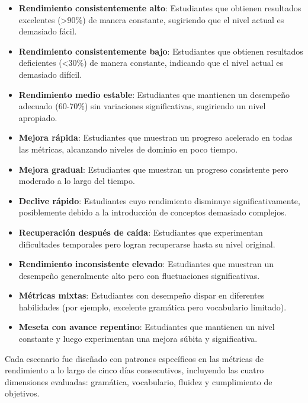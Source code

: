 \begin{itemize}
    \item \textbf{Rendimiento consistentemente alto}: Estudiantes que obtienen resultados excelentes (>90\%) de manera constante, sugiriendo que el nivel actual es demasiado fácil.
    
    \item \textbf{Rendimiento consistentemente bajo}: Estudiantes que obtienen resultados deficientes (<30\%) de manera constante, indicando que el nivel actual es demasiado difícil.
    
    \item \textbf{Rendimiento medio estable}: Estudiantes que mantienen un desempeño adecuado (60-70\%) sin variaciones significativas, sugiriendo un nivel apropiado.
    
    \item \textbf{Mejora rápida}: Estudiantes que muestran un progreso acelerado en todas las métricas, alcanzando niveles de dominio en poco tiempo.
    
    \item \textbf{Mejora gradual}: Estudiantes que muestran un progreso consistente pero moderado a lo largo del tiempo.
    
    \item \textbf{Declive rápido}: Estudiantes cuyo rendimiento disminuye significativamente, posiblemente debido a la introducción de conceptos demasiado complejos.
    
    \item \textbf{Recuperación después de caída}: Estudiantes que experimentan dificultades temporales pero logran recuperarse hasta su nivel original.
    
    \item \textbf{Rendimiento inconsistente elevado}: Estudiantes que muestran un desempeño generalmente alto pero con fluctuaciones significativas.
    
    \item \textbf{Métricas mixtas}: Estudiantes con desempeño dispar en diferentes habilidades (por ejemplo, excelente gramática pero vocabulario limitado).
    
    \item \textbf{Meseta con avance repentino}: Estudiantes que mantienen un nivel constante y luego experimentan una mejora súbita y significativa.
\end{itemize}

Cada escenario fue diseñado con patrones específicos en las métricas de rendimiento a lo largo de cinco días consecutivos, incluyendo las cuatro dimensiones evaluadas: gramática, vocabulario, fluidez y cumplimiento de objetivos.


